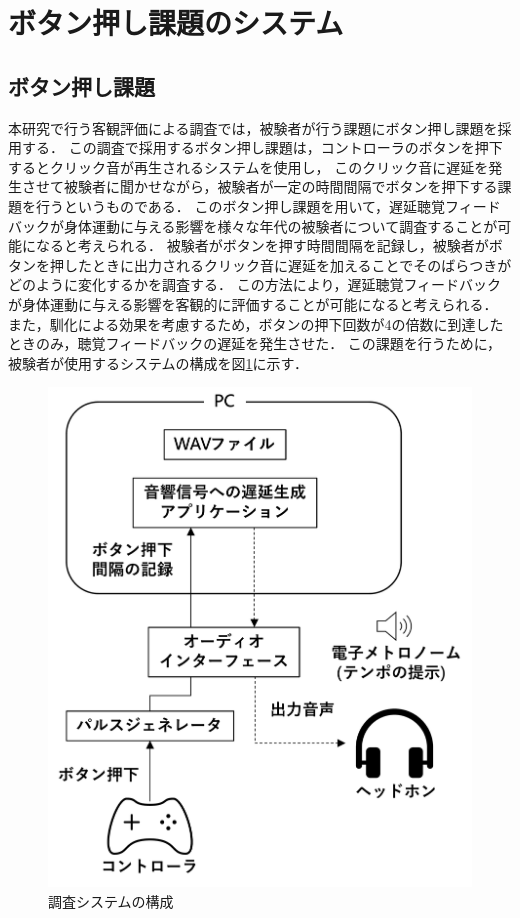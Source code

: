 \section{ボタン押し課題のシステム}
\subsection{ボタン押し課題}
本研究で行う客観評価による調査では，被験者が行う課題にボタン押し課題を採用する．
この調査で採用するボタン押し課題は，コントローラのボタンを押下するとクリック音が再生されるシステムを使用し，
このクリック音に遅延を発生させて被験者に聞かせながら，被験者が一定の時間間隔でボタンを押下する課題を行うというものである．
このボタン押し課題を用いて，遅延聴覚フィードバックが身体運動に与える影響を様々な年代の被験者について調査することが可能になると考えられる．
被験者がボタンを押す時間間隔を記録し，被験者がボタンを押したときに出力されるクリック音に遅延を加えることでそのばらつきがどのように変化するかを調査する．
この方法により，遅延聴覚フィードバックが身体運動に与える影響を客観的に評価することが可能になると考えられる．
また，馴化による効果を考慮するため，ボタンの押下回数が4の倍数に到達したときのみ，聴覚フィードバックの遅延を発生させた．
この課題を行うために，被験者が使用するシステムの構成を図\ref{fig:button-click-system}に示す．
\begin{figure}[tb]
  \centering
  \includegraphics[scale=0.15]{figures/system_button_click.pdf}
  \caption{調査システムの構成}
  \label{fig:button-click-system}
\end{figure}
